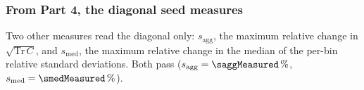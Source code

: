 \subsubsection{From Part 4, the diagonal seed measures}
Two other measures read the diagonal only: $s_{\mathrm{agg}}$, the maximum relative change in $\sqrt{\mathrm{Tr}\,C}$, and $s_{\mathrm{med}}$, the maximum relative change in the median of the per-bin relative standard deviations. Both pass ($s_{\mathrm{agg}}=\saggMeasured\,\%$, $s_{\mathrm{med}}=\smedMeasured\,\%$).
